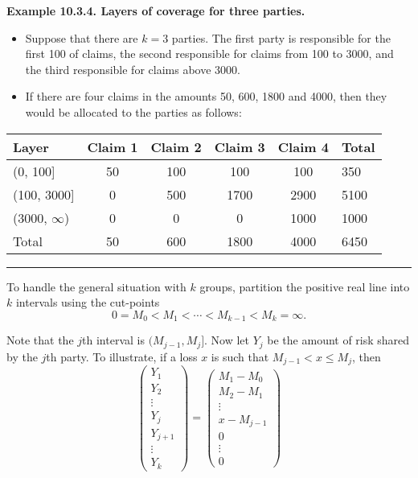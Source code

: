 \documentclass[]{book}
\theoremstyle{definition}
\theoremstyle{definition}
\theoremstyle{definition}
\theoremstyle{remark}
\begin{document}
\textbf{Example 10.3.4. Layers of coverage for three parties.}

\begin{itemize}
\item
  Suppose that there are \(k=3\) parties. The first party is responsible
  for the first 100 of claims, the second responsible for claims from
  100 to 3000, and the third responsible for claims above 3000.
\item
  If there are four claims in the amounts 50, 600, 1800 and 4000, then
  they would be allocated to the parties as follows:
\end{itemize}

\begin{longtable}[]{@{}lccccl@{}}
\toprule
Layer & Claim 1 & Claim 2 & Claim 3 & Claim 4 & Total\tabularnewline
\midrule
\endhead
(0, 100{]} & 50 & 100 & 100 & 100 & 350\tabularnewline
(100, 3000{]} & 0 & 500 & 1700 & 2900 & 5100\tabularnewline
(3000, \(\infty\)) & 0 & 0 & 0 & 1000 & 1000\tabularnewline
Total & 50 & 600 & 1800 & 4000 & 6450\tabularnewline
\bottomrule
\end{longtable}

\begin{center}\rule{0.5\linewidth}{\linethickness}\end{center}

To handle the general situation with \(k\) groups, partition the
positive real line into \(k\) intervals using the cut-points
\[0 = M_0 < M_1 < \cdots < M_{k-1} < M_k = \infty.\]

Note that the \(j\)th interval is \((M_{j-1}, M_j]\). Now let \(Y_j\) be
the amount of risk shared by the \(j\)th party. To illustrate, if a loss
\(x\) is such that \(M_{j-1} <x \le M_j\), then \[\left(\begin{array}{c}
    Y_1\\ Y_2 \\ \vdots \\ Y_j \\Y_{j+1} \\ \vdots \\Y_k
    \end{array}\right)
    =\left(\begin{array}{c}
    M_1-M_0 \\ M_2-M_1  \\ \vdots \\ x-M_{j-1}  \\ 0 \\ \vdots \\0
    \end{array}\right)\]
\end{document}

